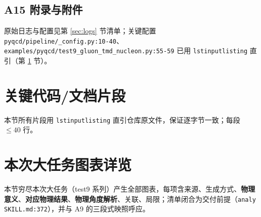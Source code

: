\documentclass[UTF8]{ctexart}
\begin{document}
\subsection{A15 附录与附件}
原始日志与配置见第 \ref{sec:logs} 节清单；关键配置 \texttt{\nolinkurl{pyqcd/pipeline/\_config.py:10-40}}、\texttt{\nolinkurl{examples/pyqcd/test9\_gluon\_tmd\_nucleon.py:55-59}} 已用 \texttt{lstinputlisting} 直引（第 \ref{sec:fragments} 节）。

\section{关键代码/文档片段}
\label{sec:fragments}
本节所有片段用 \texttt{lstinputlisting} 直引仓库原文件，保证逐字节一致；每段 $\le40$ 行。















\section{本次大任务图表详览}
\label{sec:charts}
本节穷尽本次大任务（test9 系列）产生全部图表，每项含来源、生成方式、\textbf{物理意义}、\textbf{对应物理结果}、\textbf{物理角度解析}、关联、局限；清单闭合为交付前提（\texttt{\nolinkurl{analy SKILL.md:372}}），并与 A9 的三段式映照呼应。
\end{document}
